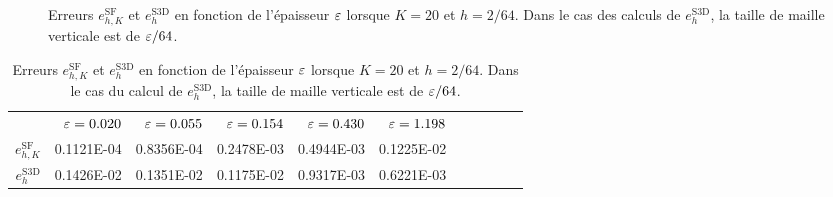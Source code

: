 \begin{figure}[h!]
  \begin{center}
    
    \caption{Erreurs $e_{h,K}^\mathrm{SF}$ et $e_h^\mathrm{S3D}$ en fonction
    de l'épaisseur $\varepsilon$ lorsque $K = 20$ et $h = 2/64$. Dans
    le cas des calculs de $e_h^\mathrm{S3D}$, la taille de maille
    verticale est de $\varepsilon/64$.}
    \label{fig:e-sf-e-s3d-convergence}
  \end{center}
\end{figure}

\begin{table}[h!]
  \caption{Erreurs $e_{h,K}^\mathrm{SF}$ et $e_h^\mathrm{S3D}$ en
    fonction de l'épaisseur $\varepsilon$ lorsque $K = 20$ et $h =
    2/64$.  Dans le cas du calcul de $e_h^\mathrm{S3D}$, la taille de
    maille verticale est de $\varepsilon/64$.}
  \label{tab:e-sf-e-s3d-convergence}
  \begin{center}
    \begin{tabular}{@{}rrrrrrrrrrr@{}}
      \toprule
      & $\varepsilon = 0.020$
      & $\varepsilon = 0.055$
      & $\varepsilon = 0.154$
      & $\varepsilon = 0.430$
      & $\varepsilon = 1.198$ \\
      \cmidrule{2-6}
      $e_{h,K}^\mathrm{SF}$  & \num{0.1121E-04} & \num{0.8356E-04} & \num{0.2478E-03} & \num{0.4944E-03} & \num{0.1225E-02}\\
      $e_h^\mathrm{S3D}$ & \num{0.1426E-02} & \num{0.1351E-02} & \num{0.1175E-02} & \num{0.9317E-03} & \num{0.6221E-03}\\
      \bottomrule
    \end{tabular}
  \end{center}
\end{table}

